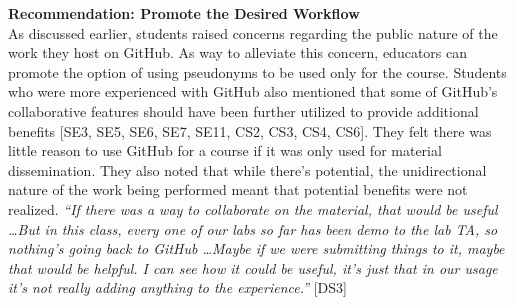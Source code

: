 \textbf{Recommendation: Promote the Desired Workflow}\\
As discussed earlier, students raised concerns regarding the public nature of the work they host on GitHub. As way to alleviate this concern, educators can promote the option of using pseudonyms to be used only for the course.
Students who were more experienced with GitHub also mentioned that some of GitHub's collaborative features should have been further utilized to provide additional benefits [SE3, SE5, SE6, SE7, SE11, CS2, CS3, CS4, CS6]. They felt there was little reason to use GitHub for a course if it was only used for material dissemination. They also noted that while there's potential, the unidirectional nature of the work being performed meant that potential benefits were not realized. \textit{``If there was a way to collaborate on the material, that would be useful \ldots But in this class, every one of our labs so far has been demo to the lab TA, so nothing's going back to GitHub \ldots Maybe if we were submitting things to it, maybe that would be helpful. I can see how it could be useful, it's just that in our usage it's not really adding anything to the experience.''} [DS3]



